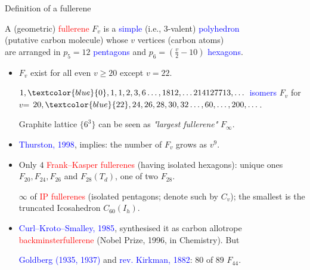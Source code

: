\documentclass{beamer}
\begin{document}
\begin{frame}{Definition of a fullerene}


A (geometric) \textcolor{red}{fullerene} $F_v$ is a 
\textcolor{blue}{simple}
(i.e., $3$-valent)
 \textcolor{blue}{polyhedron}\\
(putative carbon molecule) whose $v$ vertices (carbon atoms) \\are
arranged in $p_5=12$
\textcolor{blue}{pentagons} and $p_6=(\frac{v}{2}-10)$ 
\textcolor{blue}{hexagons}.

\begin{itemize}
\item $F_v$ exist for all even $v\geq 20$ except $v=22$.

$1,\textcolor{blue}{0},1,1,2,3,6 \dots, 1812, \dots 214127713, \dots$
\textcolor{blue}{isomers} $F_v$ for
$v$= $20, \textcolor{blue}{22},
 24, 26,28,30,32
\dots, 60, \dots , 200, \dots $.

 Graphite lattice $\{6^3\}$ can be seen as 
{\em "largest fullerene"}
$F_{\infty}$.



\item \textcolor{blue}{Thurston, 1998}, implies: the number of $F_v$ grows as $v^9$.
\pause



\item Only $4$ 
\textcolor{red}{Frank--Kasper fullerenes} (having isolated hexagons): unique ones $F_{20},F_{24},F_{26}$ and $F_{28}(T_d)$, one of two $F_{28}$.

$\infty$  of \textcolor{red}{IP fullerenes} (isolated pentagons; denote such by $C_v$); the smallest is  the truncated Icosahedron $C_{60}(I_h)$. 

\item \textcolor{blue}{Curl--Kroto--Smalley, 1985}, synthesised it as 
carbon allotrope 
\textcolor{red}{backminsterfullerene} (Nobel Prize, 1996, in Chemistry). But

\textcolor{blue}{Goldberg (1935, 1937)} and 
\textcolor{blue}{rev. Kirkman, 1882}: $80$ of $89$ $F_{44}$.




\end{itemize}
\end{frame}
\end{document}
